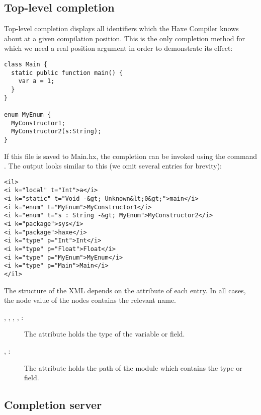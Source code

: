 \subsection{Top-level completion}
\label{cr-completion-top-level}

Top-level completion displays all identifiers which the Haxe Compiler knows about at a given compilation position. This is the only completion method for which we need a real position argument in order to demonstrate its effect:

\begin{lstlisting}
class Main {
  static public function main() {
    var a = 1;
  }
}

enum MyEnum {
  MyConstructor1;
  MyConstructor2(s:String);
}
\end{lstlisting}

If this file is saved to Main.hx, the completion can be invoked using the command . The output looks similar to this (we omit several entries for brevity):

\begin{lstlisting}
<il>
<i k="local" t="Int">a</i>
<i k="static" t="Void -&gt; Unknown&lt;0&gt;">main</i>
<i k="enum" t="MyEnum">MyConstructor1</i>
<i k="enum" t="s : String -&gt; MyEnum">MyConstructor2</i>
<i k="package">sys</i>
<i k="package">haxe</i>
<i k="type" p="Int">Int</i>
<i k="type" p="Float">Float</i>
<i k="type" p="MyEnum">MyEnum</i>
<i k="type" p="Main">Main</i>
</il>
\end{lstlisting}

The structure of the XML depends on the  attribute of each entry. In all cases, the node value of the  nodes contains the relevant name.

\begin{description}
    \item[, , , , :] The  attribute holds the type of the variable or field.
    \item[, :] The  attribute holds the path of the module which contains the type or field.
\end{description}



\subsection{Completion server}
\label{cr-completion-server}

